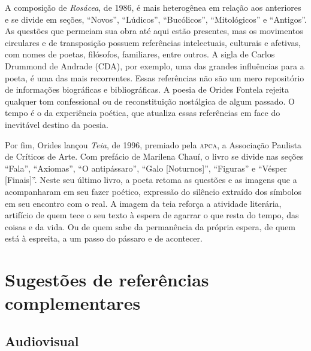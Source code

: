 \documentclass[12pt]{extarticle}
\begin{document}
A composição de \emph{Rosácea}, de 1986, é mais heterogênea em relação
aos anteriores e se divide em seções, ``Novos'', ``Lúdicos'',
``Bucólicos'', ``Mitológicos'' e ``Antigos''. As questões que permeiam
sua obra até aqui estão presentes, mas os movimentos circulares e de
transposição possuem referências intelectuais, culturais e afetivas, com
nomes de poetas, filósofos, familiares, entre outros. A sigla de Carlos
Drummond de Andrade (CDA), por exemplo, uma das grandes influências para
a poeta, é uma das mais recorrentes. Essas referências não são um mero
repositório de informações biográficas e bibliográficas. A poesia de
Orides Fontela rejeita qualquer tom confessional ou de reconstituição
nostálgica de algum passado. O tempo é o da experiência poética, que
atualiza essas referências em face do inevitável destino da poesia.






Por fim, Orides lançou \emph{Teia}, de 1996, premiado pela \textsc{apca}, a
Associação Paulista de Críticos de Arte. Com prefácio de Marilena Chauí,
o livro se divide nas seções ``Fala'', ``Axiomas'', ``O antipássaro'',
``Galo {[}Noturnos{]}'', ``Figuras'' e ``Vésper {[}Finais{]}''. Neste
seu último livro, a poeta retoma as questões e as imagens que a
acompanharam em seu fazer poético, expressão do silêncio extraído dos
símbolos em seu encontro com o real. A imagem da teia reforça a
atividade literária, artifício de quem tece o seu texto à espera de
agarrar o que resta do tempo, das coisas e da vida. Ou de quem sabe da
permanência da própria espera, de quem está à espreita, a um passo do
pássaro e de acontecer.




\section{Sugestões de referências complementares}

\subsection{Audiovisual}
\end{document}
